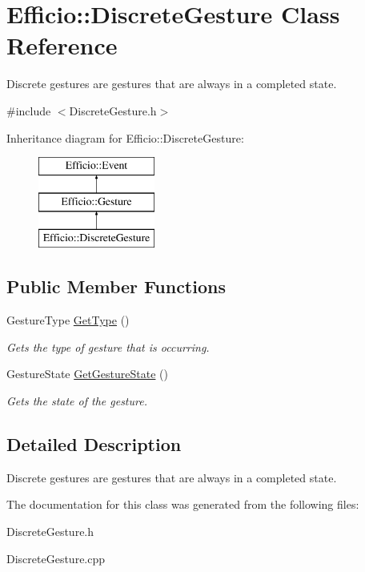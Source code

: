 \hypertarget{class_efficio_1_1_discrete_gesture}{}\section{Efficio\+:\+:Discrete\+Gesture Class Reference}
\label{class_efficio_1_1_discrete_gesture}


Discrete gestures are gestures that are always in a completed state.  




{\ttfamily \#include $<$Discrete\+Gesture.\+h$>$}

Inheritance diagram for Efficio\+:\+:Discrete\+Gesture\+:\begin{figure}[H]
\begin{center}
\leavevmode
\includegraphics[height=3.000000cm]{class_efficio_1_1_discrete_gesture}
\end{center}
\end{figure}
\subsection*{Public Member Functions}
\begin{DoxyCompactItemize}
\item 
Gesture\+Type \hyperlink{class_efficio_1_1_discrete_gesture_af404a6eb27855c4706ba37fe2f6bfa2b}{Get\+Type} ()\hypertarget{class_efficio_1_1_discrete_gesture_af404a6eb27855c4706ba37fe2f6bfa2b}{}\label{class_efficio_1_1_discrete_gesture_af404a6eb27855c4706ba37fe2f6bfa2b}

\begin{DoxyCompactList}\small\item\em Gets the type of gesture that is occurring. \end{DoxyCompactList}\item 
Gesture\+State \hyperlink{class_efficio_1_1_discrete_gesture_aeafe95240335a9931bcf32d11d97d91f}{Get\+Gesture\+State} ()\hypertarget{class_efficio_1_1_discrete_gesture_aeafe95240335a9931bcf32d11d97d91f}{}\label{class_efficio_1_1_discrete_gesture_aeafe95240335a9931bcf32d11d97d91f}

\begin{DoxyCompactList}\small\item\em Gets the state of the gesture. \end{DoxyCompactList}\end{DoxyCompactItemize}


\subsection{Detailed Description}
Discrete gestures are gestures that are always in a completed state. 

The documentation for this class was generated from the following files\+:\begin{DoxyCompactItemize}
\item 
Discrete\+Gesture.\+h\item 
Discrete\+Gesture.\+cpp\end{DoxyCompactItemize}
